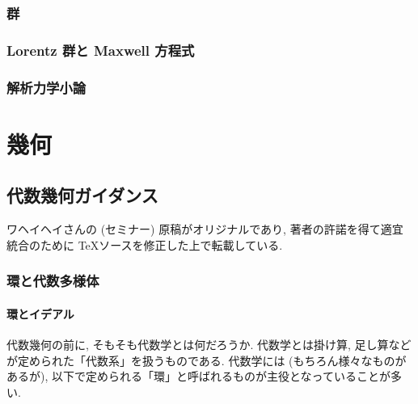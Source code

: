 \documentclass[openany, a4paper, oneside]{jsbook}
\theoremstyle{break}
\theoremstyle{breakdefn}
\begin{document}
\section{群}

\section{Lorentz 群と Maxwell 方程式}

\section{解析力学小論}

\part{幾何}

\chapter{代数幾何ガイダンス}


ワヘイヘイさんの (セミナー) 原稿がオリジナルであり,
著者の許諾を得て適宜統合のために \TeX ソースを修正した上で転載している.

\nocite{GrothendieckDieudonne1}
\nocite{JeanPierreSerre1}
\nocite{RobinHartshorne1}
\nocite{GortzWedhorn1}
\nocite{NagataMiyanishiMaruyama1}
\nocite{ToshiyukiKatsura4}
\nocite{YujiroKawamata1}
\nocite{KenjiUeno1}
\nocite{ShihokoIshii1}
\nocite{MasayoshiNagata1}
\nocite{Atiyah-Macdonald}
\section{環と代数多様体}

\subsection{環とイデアル}


代数幾何の前に, そもそも代数学とは何だろうか.
代数学とは掛け算, 足し算などが定められた「代数系」を扱うものである.
代数学には (もちろん様々なものがあるが), 以下で定められる「環」と呼ばれるものが主役となっていることが多い.
\end{document}
